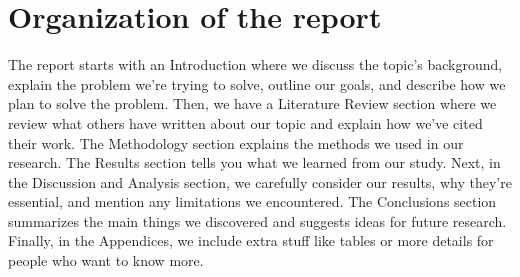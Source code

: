 \section{Organization of the report} 
The report starts with an Introduction where we discuss the topic's background, explain the problem we're trying to solve, outline our goals, and describe how we plan to solve the problem. Then, we have a Literature Review section where we review what others have written about our topic and explain how we've cited their work. The Methodology section explains the methods we used in our research. The Results section tells you what we learned from our study. Next, in the Discussion and Analysis section, we carefully consider our results, why they're essential, and mention any limitations we encountered. The Conclusions section summarizes the main things we discovered and suggests ideas for future research. Finally, in the Appendices, we include extra stuff like tables or more details for people who want to know more.





